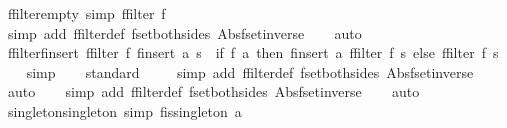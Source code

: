 \begin{isabellebody}
\endisatagproof
{\isafoldproof}%
%
\isadelimproof
\isanewline
%
\endisadelimproof
\isanewline
{}\isamarkupfalse%
\ ffilter{\isacharunderscore}empty\ {\isacharbrackleft}simp{\isacharbrackright}{\isacharcolon}\ {\isachardoublequoteopen}ffilter\ f\ {\isacharbraceleft}{\isacharbar}{\isacharbar}{\isacharbraceright}\ {\isacharequal}\ {\isacharbraceleft}{\isacharbar}{\isacharbar}{\isacharbraceright}{\isachardoublequoteclose}\isanewline
%
\isadelimproof
\ \ %
\endisadelimproof
%
\isatagproof
{}\isamarkupfalse%
\ {\isacharparenleft}simp\ add{\isacharcolon}\ ffilter{\isacharunderscore}def\ fset{\isacharunderscore}both{\isacharunderscore}sides\ Abs{\isacharunderscore}fset{\isacharunderscore}inverse{\isacharparenright}\isanewline
\ \ \isamarkupfalse%
\ auto%
\endisatagproof
{\isafoldproof}%
%
\isadelimproof
\isanewline
%
\endisadelimproof
\isanewline
{}\isamarkupfalse%
\ ffilter{\isacharunderscore}finsert{\isacharcolon}\ {\isachardoublequoteopen}ffilter\ f\ {\isacharparenleft}finsert\ a\ s{\isacharparenright}\ {\isacharequal}\ {\isacharparenleft}if\ f\ a\ then\ finsert\ a\ {\isacharparenleft}ffilter\ f\ s{\isacharparenright}\ else\ {\isacharparenleft}ffilter\ f\ s{\isacharparenright}{\isacharparenright}{\isachardoublequoteclose}\isanewline
%
\isadelimproof
\ \ %
\endisadelimproof
%
\isatagproof
{}\isamarkupfalse%
\ simp\isanewline
\ \ \isamarkupfalse%
\ standard\isanewline
\ \ \ \isamarkupfalse%
\ {\isacharparenleft}simp\ add{\isacharcolon}\ ffilter{\isacharunderscore}def\ fset{\isacharunderscore}both{\isacharunderscore}sides\ Abs{\isacharunderscore}fset{\isacharunderscore}inverse{\isacharparenright}\isanewline
\ \ \ \isamarkupfalse%
\ auto{\isacharbrackleft}{}{\isacharbrackright}\isanewline
\ \ \isamarkupfalse%
\ {\isacharparenleft}simp\ add{\isacharcolon}\ ffilter{\isacharunderscore}def\ fset{\isacharunderscore}both{\isacharunderscore}sides\ Abs{\isacharunderscore}fset{\isacharunderscore}inverse{\isacharparenright}\isanewline
\ \ \isamarkupfalse%
\ auto%
\endisatagproof
{\isafoldproof}%
%
\isadelimproof
\isanewline
%
\endisadelimproof
\isanewline
{}\isamarkupfalse%
\ singleton{\isacharunderscore}singleton\ {\isacharbrackleft}simp{\isacharbrackright}{\isacharcolon}\ {\isachardoublequoteopen}fis{\isacharunderscore}singleton\ {\isacharbraceleft}{\isacharbar}a{\isacharbar}{\isacharbraceright}{\isachardoublequoteclose}\isanewline
%
\isadelimproof
\ \ %
\endisadelimproof
%
\isatagproof

\end{isabellebody}
